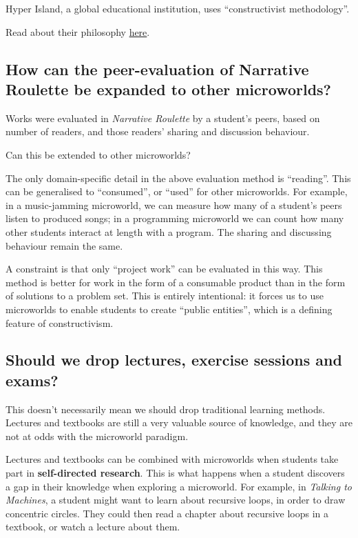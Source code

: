 Hyper Island, a global educational institution, uses ``constructivist methodology''.

Read about their philosophy \href{http://www.hyperisland.com/singapore/sgma/philosophy}{here}.

\subsection{How can the peer-evaluation of Narrative Roulette be
expanded to other microworlds?}

Works were evaluated in \emph{Narrative Roulette} by a student's peers,
based on number of readers, and those readers' sharing and discussion
behaviour.

Can this be extended to other microworlds?

The only domain-specific detail in the above evaluation method is
``reading''. This can be generalised to ``consumed'', or ``used'' for
other microworlds. For example, in a music-jamming microworld, we can
measure how many of a student's peers listen to produced songs; in a
programming microworld we can count how many other students interact at
length with a program. The sharing and discussing behaviour remain the
same.

A constraint is that only ``project work'' can be evaluated in this way.
This method is better for work in the form of a consumable product than in the form of solutions to
a problem set. This is entirely intentional: it forces us to
use microworlds to enable students to create ``public entities'', which
is a defining feature of constructivism.

\subsection{Should we drop lectures, exercise sessions and exams?}

This doesn't necessarily mean we should drop traditional learning
methods. Lectures and textbooks are still a very valuable source of
knowledge, and they are not at odds with the microworld paradigm.

Lectures and textbooks can be combined with microworlds when students
take part in \textbf{self-directed research}. This is what happens when
a student discovers a gap in their knowledge when exploring a
microworld. For example, in \emph{Talking to Machines}, a student might
want to learn about recursive loops, in order to draw concentric
circles. They could then read a chapter about recursive loops in a
textbook, or watch a lecture about them.

